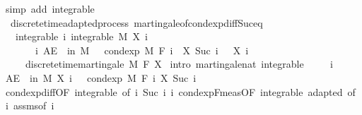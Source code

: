 \begin{isabellebody}
\isanewline
{}\isamarkupfalse%
\ {\isacharparenleft}{\kern0pt}simp\ add{\isacharcolon}{\kern0pt}\ integrable{\isacharparenright}{\kern0pt}%
\endisatagproof
{\isafoldproof}%
%
\isadelimproof
\isanewline
%
\endisadelimproof
\isanewline
{}\isamarkupfalse%
\ {\isacharparenleft}{\kern0pt}\ discrete{\isacharunderscore}{\kern0pt}time{\isacharunderscore}{\kern0pt}adapted{\isacharunderscore}{\kern0pt}process{\isacharparenright}{\kern0pt}\ martingale{\isacharunderscore}{\kern0pt}of{\isacharunderscore}{\kern0pt}cond{\isacharunderscore}{\kern0pt}exp{\isacharunderscore}{\kern0pt}diff{\isacharunderscore}{\kern0pt}Suc{\isacharunderscore}{\kern0pt}eq{\isacharunderscore}{\kern0pt}{}{\isacharcolon}{\kern0pt}\isanewline
\ \ \ integrable{\isacharcolon}{\kern0pt}\ {\isachardoublequoteopen}{\isasymAnd}i{\isachardot}{\kern0pt}\ integrable\ M\ {\isacharparenleft}{\kern0pt}X\ i{\isacharparenright}{\kern0pt}{\isachardoublequoteclose}\ \isanewline
\ \ \ \ \ \ \ {\isachardoublequoteopen}{\isasymAnd}i{\isachardot}{\kern0pt}\ AE\ {\isasymxi}\ in\ M{\isachardot}{\kern0pt}\ {}\ {\isacharequal}{\kern0pt}\ cond{\isacharunderscore}{\kern0pt}exp\ M\ {\isacharparenleft}{\kern0pt}F\ i{\isacharparenright}{\kern0pt}\ {\isacharparenleft}{\kern0pt}{\isasymlambda}{\isasymxi}{\isachardot}{\kern0pt}\ X\ {\isacharparenleft}{\kern0pt}Suc\ i{\isacharparenright}{\kern0pt}\ {\isasymxi}\ {\isacharminus}{\kern0pt}\ X\ i\ {\isasymxi}{\isacharparenright}{\kern0pt}\ {\isasymxi}{\isachardoublequoteclose}\ \isanewline
\ \ \ \ \ {\isachardoublequoteopen}discrete{\isacharunderscore}{\kern0pt}time{\isacharunderscore}{\kern0pt}martingale\ M\ F\ X{\isachardoublequoteclose}\isanewline
%
\isadelimproof
%
\endisadelimproof
%
\isatagproof
{}\isamarkupfalse%
\ {\isacharparenleft}{\kern0pt}intro\ martingale{\isacharunderscore}{\kern0pt}nat\ integrable{\isacharparenright}{\kern0pt}\ \isanewline
\ \ \isamarkupfalse%
\ i\ \isanewline
\ \ \isamarkupfalse%
\ {\isachardoublequoteopen}AE\ {\isasymxi}\ in\ M{\isachardot}{\kern0pt}\ X\ i\ {\isasymxi}\ {\isacharequal}{\kern0pt}\ cond{\isacharunderscore}{\kern0pt}exp\ M\ {\isacharparenleft}{\kern0pt}F\ i{\isacharparenright}{\kern0pt}\ {\isacharparenleft}{\kern0pt}X\ {\isacharparenleft}{\kern0pt}Suc\ i{\isacharparenright}{\kern0pt}{\isacharparenright}{\kern0pt}\ {\isasymxi}{\isachardoublequoteclose}\ \isamarkupfalse%
\ cond{\isacharunderscore}{\kern0pt}exp{\isacharunderscore}{\kern0pt}diff{\isacharbrackleft}{\kern0pt}OF\ integrable{\isacharparenleft}{\kern0pt}{}{\isacharcomma}{\kern0pt}{}{\isacharparenright}{\kern0pt}{\isacharcomma}{\kern0pt}\ of\ i\ {\isachardoublequoteopen}Suc\ i{\isachardoublequoteclose}\ i{\isacharbrackright}{\kern0pt}\ cond{\isacharunderscore}{\kern0pt}exp{\isacharunderscore}{\kern0pt}F{\isacharunderscore}{\kern0pt}meas{\isacharbrackleft}{\kern0pt}OF\ integrable\ adapted{\isacharcomma}{\kern0pt}\ of\ i{\isacharbrackright}{\kern0pt}\ assms{\isacharparenleft}{\kern0pt}{}{\isacharparenright}{\kern0pt}{\isacharbrackleft}{\kern0pt}of\ i{\isacharbrackright}{\kern0pt}\ \isamarkupfalse%

\end{isabellebody}
